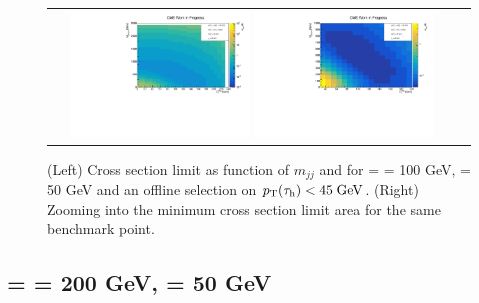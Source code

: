 \begin{figure}[tbh!]
	\centering
	\begin{tabular}{cc}
		\includegraphics[width=0.45\textwidth]{analysis/pics/JetInvMass_vs_MET_xsec_chi100_lsp050_taupt45.pdf}
		\includegraphics[width=0.45\textwidth]{analysis/pics/JetInvMass_vs_MET_xsec_chi100_lsp050_taupt45_zoom.pdf}
	\end{tabular}
	\caption{(Left) Cross section limit as function of $m_{jj}$ and \met for \charginopm = \neutralinotwo = 100 GeV, \neutralinoone = 50 GeV and an offline selection on $p_{\text{T}}(\tau_{\text{h}}) <  45\;\text{Ge}\kern-0.06667em\text{V}$. (Right) Zooming into the minimum cross section limit area for the same benchmark point.}
	\label{fig::JetInvMass_vs_MET_xsec_chi100_lsp050_taupt45}
\end{figure}

\FloatBarrier

\subsection*{\charginopm = \neutralinotwo = 200 GeV, \neutralinoone = 50 GeV}

\FloatBarrier

